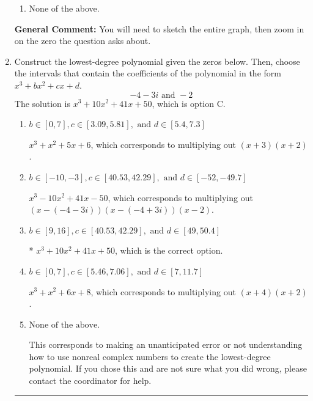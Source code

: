 \documentclass{extbook}[14pt]
\newcommand{\litem}[1]{\item #1

\rule{\textwidth}{0.4pt}}
\begin{document}
\begin{enumerate}
{\begin{enumerate}[label=\Alph*.]
\item None of the above.\end{enumerate}
\textbf{General Comment:} You will need to sketch the entire graph, then zoom in on the zero the question asks about.
}
\litem{
Construct the lowest-degree polynomial given the zeros below. Then, choose the intervals that contain the coefficients of the polynomial in the form $x^3+bx^2+cx+d$.
\[ -4 - 3 i \text{ and } -2 \]
The solution is \( x^{3} +10 x^{2} +41 x + 50 \), which is option C.\begin{enumerate}[label=\Alph*.]
\item \( b \in [0, 7], c \in [3.09, 5.81], \text{ and } d \in [5.4, 7.3] \)

$x^{3} + x^{2} +5 x + 6$, which corresponds to multiplying out $(x + 3)(x + 2)$.
\item \( b \in [-10, -3], c \in [40.53, 42.29], \text{ and } d \in [-52, -49.7] \)

$x^{3} -10 x^{2} +41 x -50$, which corresponds to multiplying out $(x-(-4 - 3 i))(x-(-4 + 3 i))(x -2)$.
\item \( b \in [9, 16], c \in [40.53, 42.29], \text{ and } d \in [49, 50.4] \)

* $x^{3} +10 x^{2} +41 x + 50$, which is the correct option.
\item \( b \in [0, 7], c \in [5.46, 7.06], \text{ and } d \in [7, 11.7] \)

$x^{3} + x^{2} +6 x + 8$, which corresponds to multiplying out $(x + 4)(x + 2)$.
\item \( \text{None of the above.} \)

This corresponds to making an unanticipated error or not understanding how to use nonreal complex numbers to create the lowest-degree polynomial. If you chose this and are not sure what you did wrong, please contact the coordinator for help.
\end{enumerate}

}
\end{enumerate}
\end{document}
